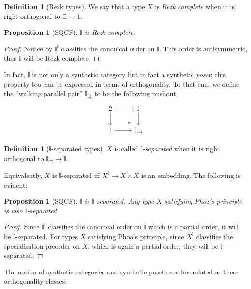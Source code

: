 \documentclass[a4paper,12pt]{amsart}
\newtheorem{proposition}[theorem]{Proposition}
\theoremstyle{definition}
\newtheorem{definition}[theorem]{Definition}
\newcommand{\mbb}[1]{\mathbb{#1}}
\newcommand{\I}{\mbb I}
\begin{document}
\begin{definition}[Rezk types]
  We say that a type $X$ is \emph{Rezk complete} when it is right orthogonal to $\mbb E \to 1$.
\end{definition}

\begin{proposition}[SQCF]
  $\I$ is Rezk complete.
\end{proposition}
\begin{proof}
  Notice by  $\I^\I$ classifies the canonical order on $\I$. This order is antisymmetric, thus $\I$ will be Rezk complete.
\end{proof}

In fact, $\I$ is not only a synthetic category but in fact a synthetic \emph{poset}; this property too can be expressed in terms of orthogonality. To that end, we define the ``walking parallel pair'' $\I_{\rightrightarrows}$ to be the following pushout:
\[
\begin{tikzcd}
  2 \ar[r] \ar[d] & \I \ar[d] \\ 
  \I \ar[r] & \I_{\rightrightarrows}
  \arrow["\lrcorner"{anchor=center, pos=0.125, rotate=180}, draw=none, from=2-2, to=1-1]
\end{tikzcd}
\]

\begin{definition}[$\I$-separated types]
  $X$ is called \emph{$\I$-separated} when it is right orthogonal to $\I_{\rightrightarrows} \to \I$.
\end{definition}

Equivalently, $X$ is $\I$-separated iff $X^\I \to X \times X$ is an embedding. The following is evident:

\begin{proposition}[SQCF]
  $\I$ is $\I$-separated. Any type $X$ satisfying Phoa's principle is also $\I$-separated.
\end{proposition}
\begin{proof}
  Since $\I^\I$ classifies the canonical order on $\I$ which is a partial order, it will be $\I$-separated. For types $X$ satisfying Phoa's principle, since $X^\I$ classifies the specialisation preorder on $X$, which is again a partial order, they will be $\I$-separated.
\end{proof}

The notion of synthetic categories and synthetic posets are formulated as these orthogonality classes:

\end{document}
